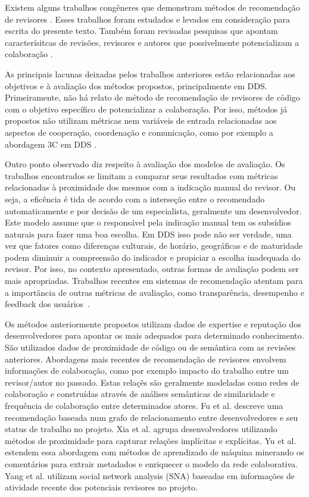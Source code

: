 \documentclass[a4paper,12pt]{monografia}
\theoremstyle{plain}
\theoremstyle{definition}
\theoremstyle{remark}
\begin{document}
Existem alguns trabalhos congêneres que demonstram métodos de recomendação de revisores \cite{yu2014,Xia2015261,jiang2017}. Esses trabalhos foram estudados e levados em consideração para escrita do presente texto. Também foram revisadas pesquisas que apontam caracterísitcas de revisões, revisores e autores que possivelmente potencializam a colaboração \cite{Kemerer2009,Bird2015191,Baysal2013122}.

As principais lacunas deixadas pelos trabalhos anteriores estão relacionadas aos objetivos e à avaliação dos métodos propostos, principalmente em DDS. Primeiramente, não há relato de método de recomendação de revisores de código com o objetivo específico de potencializar a colaboração. Por isso, métodos já propostos não utilizam métricas nem variáveis de entrada relacionadas aos aspectos de cooperação, coordenação e comunicação, como por exemplo a abordagem 3C em DDS \cite{fuks2003}.

Outro ponto observado diz respeito à avaliação dos modelos de avaliação. Os trabalhos encontrados se limitam a comparar seus resultados com métricas relacionadas à proximidade dos mesmos com a indicação manual do revisor. Ou seja, a eficência é tida de acordo com a interseção entre o recomendado automaticamente e por decisão de um especialista, geralmente um desenvolvedor. Este modelo assume que o responsável pela indicação manual tem os subsídios naturais para fazer uma boa escolha. Em DDS isso pode não ser verdade, uma vez que fatores como diferenças culturais, de horário, geográficas e de maturidade podem diminuir a compreensão do indicador e propiciar a escolha inadequada do revisor. Por isso, no contexto apresentado, outras formas de avaliação podem ser mais apropriadas. Trabalhos recentes em sistemas de recomendação atentam para a importância de outras métricas de avaliação, como transparência, desempenho e feedback dos usuários~\cite{he2016}.

Os métodos anteriormente propostos utilizam dados de expertise e reputação dos desenvolvedores para apontar os mais adequados para determinado conhecimento. São utilizados dados de proximidade de código ou de semântica com as revisões anteriores. Abordagens mais recentes de recomendação de revisores envolvem informações de colaboração, como por exemplo impacto do trabalho entre um revisor/autor no passado. Estas relaçẽs são geralmente modeladas como redes de colaboração e construídas através de análises semânticas de similaridade e frequência de colaboração entre determinados atores. Fu et al. \cite{fu2017} descreve uma recomendação baseada num grafo de relacionamento entre desenvolvedores e seu status de trabalho no projeto. Xia et al. \cite{xia2017} agrupa desenvolvedores utilizando métodos de proximidade para capturar relações implícitas e explícitas. Yu et al. \cite{yu2014,yu2014-2} estendem essa abordagem com métodos de aprendizado de máquina minerando os comentários para extrair metadados e enriquecer o modelo da rede colaborativa. Yang et al. \cite{yang2016} utilizam social network analysis (SNA) baseadas em informações de atividade recente dos potenciais revisores no projeto.
\end{document}
